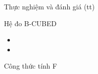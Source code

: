 \documentclass[9pt,xcolor=table,hyperref=unicode]{beamer}
\begin{document}
		\begin{frame}{Thực nghiệm và đánh giá (tt)}
			\begin{block}{Hệ đo B-CUBED}
				\begin{center}
					\begin{itemize} 
					\item{}
					\item{}
					\end{itemize}
				\end{center}
			\end{block}
			
			\begin{block}{Công thức tính F}
				\begin{center}									
				\end{center}
			\end{block}
		\end{frame}
\end{document}
